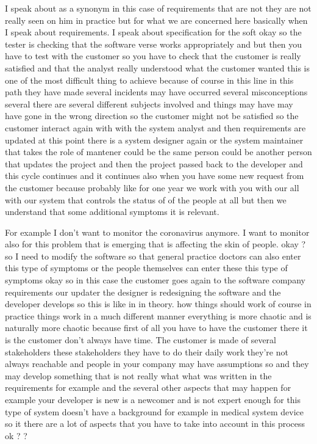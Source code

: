 \documentclass[conference, compsoc, twoside]{IEEEtran}
\begin{document}
I speak about as a synonym in this case of requirements that are not they are not really seen on him in practice but for what we are concerned here basically when I speak about requirements. 
I speak about specification for the soft okay so the tester is checking that the software verse works appropriately and but then you have to test with the customer so you have to check that the customer is really satisfied and that the analyst really understood what the customer wanted this is one of the most difficult thing to achieve because of course in this line in this path they have made several incidents may have occurred several misconceptions several there are several different subjects involved and things may have may have gone in the wrong direction so the customer might not be satisfied so the customer interact again with with the system analyst and then requirements are updated at this point there is a system designer again or the system maintainer that takes the role of mantener could be the same person could be another person that updates the project and then the project passed back to the developer and this cycle continues and it continues also when you have some new request from the customer because probably like for one year we work with you with our all with our system that controls the status of of the people at all but then we understand that some additional symptoms it is relevant.
 
For example I don't want to monitor the coronavirus anymore. 
I want to monitor also for this problem that is emerging that is affecting the skin of people.
okay ?
so I need to modify the software so that general practice doctors can also enter this type of symptoms or the people themselves can enter these this type of symptoms okay so in this case the customer goes again to the software company requirements our updater the designer is redesigning the software and the developer develops so this is like in in theory. how things should work of course in practice things work in a much different manner everything is more chaotic and is naturally more chaotic because first of all you have to have the customer there it is the customer don't always have time.
The customer is made of several stakeholders these stakeholders they have to do their daily work they're not always reachable and people in your company may have assumptions so and they may develop something that is not really what what was written in the requirements 
for example and the several other aspects that may happen 
for example your developer is new is a newcomer and is not expert enough for this type of system doesn't have a background 
for example in medical system device so it there are a lot of aspects that you have to take into account in this process ok ? ?
\end{document}
